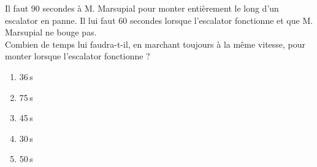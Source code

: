 Il faut 90 secondes à M. Marsupial pour monter entièrement le long d'un escalator en panne. Il lui faut 60 secondes lorsque l'escalator fonctionne et que M. Marsupial ne bouge pas.\\Combien de temps lui faudra-t-il, en marchant toujours à la même vitesse, pour monter lorsque l'escalator fonctionne ?
\begin{multicols}{5}
  \begin{enumerate}[A/]
  \item 36\,s
  \item 75\,s
  \item 45\,s
  \item 30\,s
  \item 50\,s
  \end{enumerate}
\end{multicols}